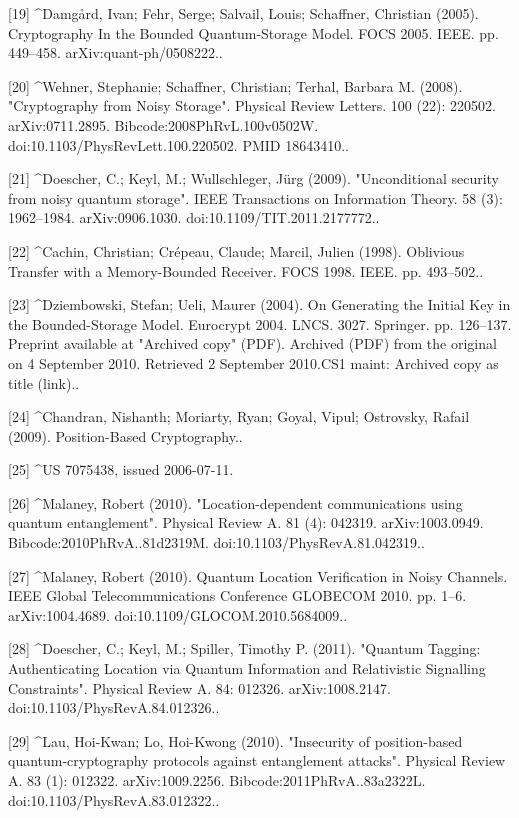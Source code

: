 [19]
^Damgård, Ivan; Fehr, Serge; Salvail, Louis; Schaffner, Christian (2005). Cryptography In the Bounded Quantum-Storage Model. FOCS 2005. IEEE. pp. 449–458. arXiv:quant-ph/0508222..

[20]
^Wehner, Stephanie; Schaffner, Christian; Terhal, Barbara M. (2008). "Cryptography from Noisy Storage". Physical Review Letters. 100 (22): 220502. arXiv:0711.2895. Bibcode:2008PhRvL.100v0502W. doi:10.1103/PhysRevLett.100.220502. PMID 18643410..

[21]
^Doescher, C.; Keyl, M.; Wullschleger, Jürg (2009). "Unconditional security from noisy quantum storage". IEEE Transactions on Information Theory. 58 (3): 1962–1984. arXiv:0906.1030. doi:10.1109/TIT.2011.2177772..

[22]
^Cachin, Christian; Crépeau, Claude; Marcil, Julien (1998). Oblivious Transfer with a Memory-Bounded Receiver. FOCS 1998. IEEE. pp. 493–502..

[23]
^Dziembowski, Stefan; Ueli, Maurer (2004). On Generating the Initial Key in the Bounded-Storage Model. Eurocrypt 2004. LNCS. 3027. Springer. pp. 126–137. Preprint available at "Archived copy" (PDF). Archived (PDF) from the original on 4 September 2010. Retrieved 2 September 2010.CS1 maint: Archived copy as title (link)..

[24]
^Chandran, Nishanth; Moriarty, Ryan; Goyal, Vipul; Ostrovsky, Rafail (2009). Position-Based Cryptography..

[25]
^US 7075438, issued 2006-07-11.

[26]
^Malaney, Robert (2010). "Location-dependent communications using quantum entanglement". Physical Review A. 81 (4): 042319. arXiv:1003.0949. Bibcode:2010PhRvA..81d2319M. doi:10.1103/PhysRevA.81.042319..

[27]
^Malaney, Robert (2010). Quantum Location Verification in Noisy Channels. IEEE Global Telecommunications Conference GLOBECOM 2010. pp. 1–6. arXiv:1004.4689. doi:10.1109/GLOCOM.2010.5684009..

[28]
^Doescher, C.; Keyl, M.; Spiller, Timothy P. (2011). "Quantum Tagging: Authenticating Location via Quantum Information and Relativistic Signalling Constraints". Physical Review A. 84: 012326. arXiv:1008.2147. doi:10.1103/PhysRevA.84.012326..

[29]
^Lau, Hoi-Kwan; Lo, Hoi-Kwong (2010). "Insecurity of position-based quantum-cryptography protocols against entanglement attacks". Physical Review A. 83 (1): 012322. arXiv:1009.2256. Bibcode:2011PhRvA..83a2322L. doi:10.1103/PhysRevA.83.012322..

